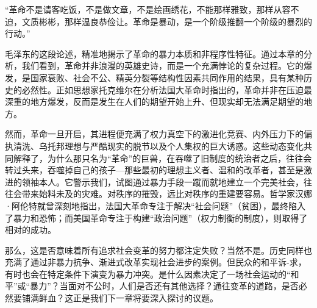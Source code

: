 “革命不是请客吃饭，不是做文章，不是绘画绣花，不能那样雅致，那样从容不迫，文质彬彬，那样温良恭俭让。革命是暴动，是一个阶级推翻一个阶级的暴烈的行动。”

毛泽东的这段论述，精准地揭示了革命的暴力本质和非程序性特征。通过本章的分析，我们看到，革命并非浪漫的英雄史诗，而是一个充满悖论的复杂过程。它的爆发，是国家衰败、社会不公、精英分裂等结构性因素共同作用的结果，具有某种历史的必然性。正如思想家托克维尔在分析法国大革命时指出的，革命并非在压迫最深重的地方爆发，反而是发生在人们的期望开始上升、但现实却无法满足期望的地方。

然而，革命一旦开启，其进程便充满了权力真空下的激进化竞赛、内外压力下的偏执清洗、乌托邦理想与严酷现实的脱节以及个人集权的巨大诱惑。这些动态变化共同解释了，为什么那只名为“革命”的巨兽，在吞噬了旧制度的统治者之后，往往会转过头来，吞噬掉自己的孩子---那些最初的理想主义者、温和的改革者，甚至是激进的领袖本人。它警示我们，试图通过暴力手段一蹴而就地建立一个完美社会，往往会带来始料未及的灾难。对秩序的摧毁，远比对秩序的重建要容易。哲学家汉娜·阿伦特就曾深刻地指出，法国大革命专注于解决“社会问题”（贫困），最终陷入了暴力和恐怖；而美国革命专注于构建“政治问题”（权力制衡的制度），则取得了相对的成功。

那么，这是否意味着所有追求社会变革的努力都注定失败？当然不是。历史同样也充满了通过非暴力抗争、渐进式改革实现社会进步的案例。但民众的和平诉-求，有时也会在特定条件下演变为暴力冲突。是什么因素决定了一场社会运动的“和平”或“暴力”？当面对不公时，人们是否还有其他选择？通往变革的道路，是否必然要铺满鲜血？这正是我们下一章将要深入探讨的议题。